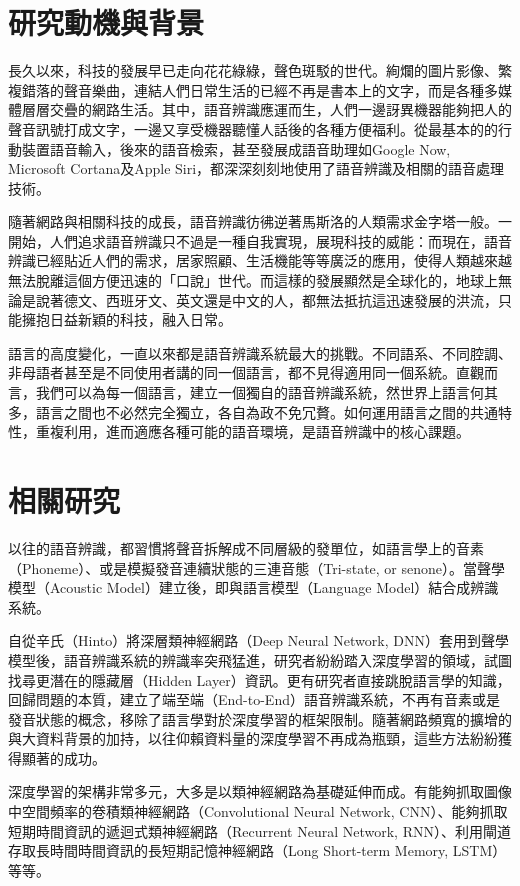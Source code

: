 \section{研究動機與背景}

長久以來，科技的發展早已走向花花綠綠，聲色斑駁的世代。絢爛的圖片影像、繁複錯落的聲音樂曲，連結人們日常生活的已經不再是書本上的文字，而是各種多媒體層層交疊的網路生活。其中，語音辨識應運而生，人們一邊訝異機器能夠把人的聲音訊號打成文字，一邊又享受機器聽懂人話後的各種方便福利。從最基本的的行動裝置語音輸入，後來的語音檢索，甚至發展成語音助理如Google Now, Microsoft Cortana及Apple Siri，都深深刻刻地使用了語音辨識及相關的語音處理技術。

隨著網路與相關科技的成長，語音辨識彷彿逆著馬斯洛的人類需求金字塔一般。一開始，人們追求語音辨識只不過是一種自我實現，展現科技的威能：而現在，語音辨識已經貼近人們的需求，居家照顧、生活機能等等廣泛的應用，使得人類越來越無法脫離這個方便迅速的「口說」世代。而這樣的發展顯然是全球化的，地球上無論是說著德文、西班牙文、英文還是中文的人，都無法抵抗這迅速發展的洪流，只能擁抱日益新穎的科技，融入日常。

語言的高度變化，一直以來都是語音辨識系統最大的挑戰。不同語系、不同腔調、非母語者甚至是不同使用者講的同一個語言，都不見得適用同一個系統。直觀而言，我們可以為每一個語言，建立一個獨自的語音辨識系統，然世界上語言何其多，語言之間也不必然完全獨立，各自為政不免冗贅。如何運用語言之間的共通特性，重複利用，進而適應各種可能的語音環境，是語音辨識中的核心課題。
\section{相關研究}
以往的語音辨識，都習慣將聲音拆解成不同層級的發單位，如語言學上的音素（Phoneme）、或是模擬發音連續狀態的三連音態（Tri-state, or senone）。當聲學模型（Acoustic Model）建立後，即與語言模型（Language Model）結合成辨識系統。
 
自從辛氏（Hinto）將深層類神經網路（Deep Neural Network, DNN）套用到聲學模型後，語音辨識系統的辨識率突飛猛進，研究者紛紛踏入深度學習的領域，試圖找尋更潛在的隱藏層（Hidden Layer）資訊。更有研究者直接跳脫語言學的知識，回歸問題的本質，建立了端至端（End-to-End）語音辨識系統，不再有音素或是發音狀態的概念，移除了語言學對於深度學習的框架限制。隨著網路頻寬的擴增的與大資料背景的加持，以往仰賴資料量的深度學習不再成為瓶頸，這些方法紛紛獲得顯著的成功。

深度學習的架構非常多元，大多是以類神經網路為基礎延伸而成。有能夠抓取圖像中空間頻率的卷積類神經網路（Convolutional Neural Network, CNN）、能夠抓取短期時間資訊的遞迴式類神經網路（Recurrent Neural Network, RNN）、利用閘道存取長時間時間資訊的長短期記憶神經網路（Long Short-term Memory, LSTM）等等。

